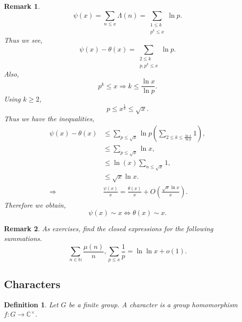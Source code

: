 \documentclass{article}
\newtheorem{definition}{Definition}[section]
\newtheorem{remark}{Remark}[section]
\newcommand{\N}[0]{\mathbb{N}}
\newcommand{\C}[0]{\mathbb{C}}
\begin{document}
\begin{remark}
  \label{remark_chebyschev_functions_relation}
  \begin{equation*}
    \psi(x) = \sum_{n\leq x}\Lambda(n) = \sum_{\substack{1\leq k\\ p^k\leq x}}\ln p.
  \end{equation*}
  Thus we see,
  \begin{equation*}
    \psi(x) -\theta(x) = \sum_{\substack{2\leq k\\p,p^k\leq x}}\ln p.
  \end{equation*}
  Also,
  \begin{equation*}
    p^k\leq x\Rightarrow k\leq {\frac {\ln x} {\ln p}}.
  \end{equation*}
  Using $k\geq 2$,
  \begin{equation*}
    p\leq x^{{\frac 1 k}}\leq \sqrt{x}.
  \end{equation*}
  Thus we have the inequalities,
  \begin{align*}
  \psi(x)-\theta(x)&\leq \sum_{p\leq \sqrt{x}}\ln p\left(\sum_{2\leq k\leq {\frac {\ln x} {\ln p}}}1\right),\\
  &\leq \sum_{p\leq \sqrt{x}}\ln x,\\
  & \leq \ln(x)\sum_{n\leq \sqrt{x}}1,\\
  &\leq \sqrt{x}\ln x.\\
  \Rightarrow & {\frac {\psi(x)} x} = {\frac {\theta(x)} x}+O\left({\frac {\sqrt{x}\ln x} x}\right).
\end{align*}
Therefore we obtain,
\begin{equation*}
  \psi(x)\sim x \Leftrightarrow\theta(x) \sim x.
\end{equation*}
\end{remark}

\begin{remark}
  As exercises, find the closed expressions for the following summations.
  \begin{equation*}
    \sum_{n\in\N}{\frac {\mu(n)} n},\sum_{p\leq x}{\frac 1 p} = \ln\ln x + o(1).
  \end{equation*}
\end{remark}

\subsection{Characters}

\begin{definition}
  Let $G$ be a finite group. A character is a group homomorphism $f:G\to \C^\times$. 
\end{definition}
\end{document}
